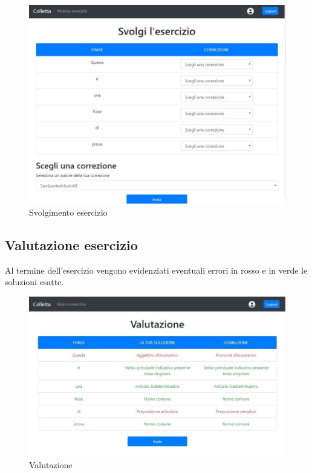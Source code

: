 \documentclass[11pt,a4paper]{article}
\begin{document}
{	\begin{figure}[h]
		\centering
		\includegraphics[scale=0.65]{images/svolgimento.jpg}
		\caption{Svolgimento esercizio}
	\end{figure}
	
	\subsection{Valutazione esercizio}
	Al termine dell'esercizio vengono evidenziati eventuali errori in rosso e in verde le soluzioni esatte.
	\newpage
		\begin{figure}[h!]
		\centering
		\includegraphics[scale=0.65]{images/valutazione.jpg}
		\caption{Valutazione}
	\end{figure}
	
}
\end{document}
